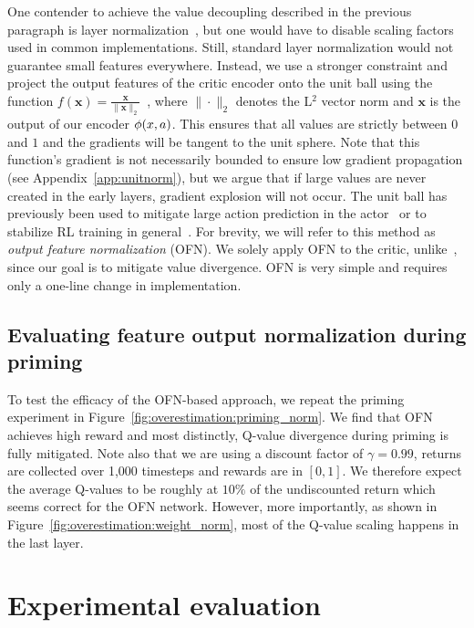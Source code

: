 One contender to achieve the value decoupling described in the previous paragraph is layer normalization~\parencite{ba2016layer}, but one would have to disable scaling factors used in common implementations. Still, standard layer normalization would not guarantee small features everywhere. Instead, we use a stronger constraint and project the output features of the critic encoder onto the unit ball using the function
$f(\mathbf{x}) = \frac{\mathbf{x} }{\|\mathbf{x}\|_2}$~\parencite{zhang2019root}, 
where $\|\cdot\|_2$ denotes the L$^2$ vector norm and $\mathbf{x}$ is the output of our encoder $\phi(x, a)$. This ensures that all values are strictly between $0$ and $1$ and the gradients will be tangent to the unit sphere. Note that this function's gradient is not necessarily bounded to ensure low gradient propagation (see Appendix~\ref{app:unitnorm}), but we argue that if large values are never created in the early layers, gradient explosion will not occur. The unit ball has previously been used to mitigate large action prediction in the actor~\parencite{wang2020striving} or to stabilize RL training in general~\parencite{bjorck2022is}. 
For brevity, we will refer to this method as {\em output feature normalization} (OFN). We solely apply OFN to the critic, unlike~\textcite{wang2020striving}, since our goal is to mitigate value divergence. OFN is very simple and requires only a one-line change in implementation.

\subsection{Evaluating feature output normalization during priming} \label{sec:evalmethod}

To test the efficacy of the OFN-based approach, we repeat the priming experiment in Figure~\ref{fig:overestimation:priming_norm}.
We find that OFN achieves high reward and most distinctly, Q-value divergence during priming is fully mitigated. 
Note also that we are using a discount factor of $\gamma = 0.99$, returns are collected over 1,000 timesteps and rewards are in $[0, 1]$. 
We therefore expect the average Q-values to be roughly at $10\%$ of the undiscounted return which seems correct for the OFN network. 
However, more importantly, as shown in Figure~\ref{fig:overestimation:weight_norm}, most of the Q-value scaling happens in the last layer.

\section{Experimental evaluation}


